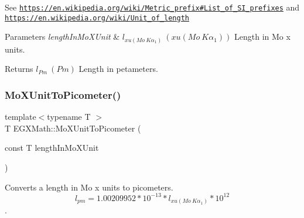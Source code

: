 See \href{https://en.wikipedia.org/wiki/Metric_prefix#List_of_SI_prefixes}{\tt https\+://en.\+wikipedia.\+org/wiki/\+Metric\+\_\+prefix\#\+List\+\_\+of\+\_\+\+S\+I\+\_\+prefixes} and \href{https://en.wikipedia.org/wiki/Unit_of_length}{\tt https\+://en.\+wikipedia.\+org/wiki/\+Unit\+\_\+of\+\_\+length} 
\begin{DoxyParams}{Parameters}
{\em length\+In\+Mo\+X\+Unit} & $ l_{xu(Mo\ K\alpha_1)}\ (xu(Mo\ K\alpha_1))$ Length in Mo x units. \\
\hline
\end{DoxyParams}
\begin{DoxyReturn}{Returns}
$ l_{Pm}\ (Pm)$ Length in petameters. 
\end{DoxyReturn}
\mbox{\label{group___e_g_x_math-_conversions-_length_conversions-_non-_s_i-_mo_x_unit-_s_i_ga9b06995f2d8ddd611999e65539f0896c}} 
\subsubsection{\texorpdfstring{Mo\+X\+Unit\+To\+Picometer()}{MoXUnitToPicometer()}}
{\footnotesize\ttfamily template$<$typename T $>$ \\
T E\+G\+X\+Math\+::\+Mo\+X\+Unit\+To\+Picometer (\begin{DoxyParamCaption}\item[{const T}]{length\+In\+Mo\+X\+Unit }\end{DoxyParamCaption})}



Converts a length in Mo x units to picometers. \[ l_{pm}=1.00209952*10^{-13} * l_{xu(Mo\ K\alpha_1)} * 10^{12} \]. 


